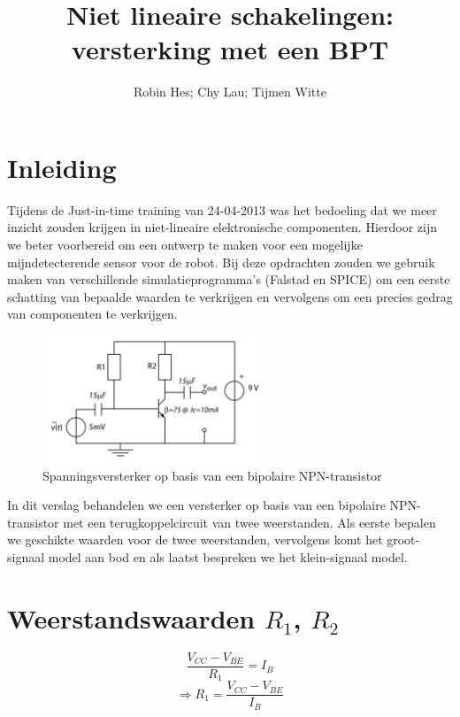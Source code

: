 \documentclass{article}
\title{Niet lineaire schakelingen: versterking met een BPT}
\author{Robin Hes; Chy Lau; Tijmen Witte}
\begin{document}
\maketitle

\section*{Inleiding}

Tijdens de Just-in-time training van 24-04-2013 was het bedoeling dat we meer inzicht zouden krijgen in niet-lineaire elektronische componenten. Hierdoor 
zijn we beter voorbereid om een ontwerp te maken voor een mogelijke mijndetecterende sensor voor de robot. Bij deze opdrachten zouden we gebruik maken van verschillende simulatieprogramma's (Falstad en SPICE) om een eerste schatting van bepaalde waarden te verkrijgen en vervolgens om een precies gedrag van componenten te verkrijgen.

\begin{figure}[H]
	\centering
	\label{fig:npn-amplifier}
	\includegraphics[width=0.6\textwidth]{resource/npn-amplifier}
	\caption{Spanningsversterker op basis van een bipolaire NPN-transistor \cite[p.~3]{epo2-non-linear}}
\end{figure}

\noindent
In dit verslag behandelen we een versterker op basis van een bipolaire NPN-transistor met een terugkoppelcircuit van twee weerstanden. Als eerste bepalen we geschikte waarden voor de twee weerstanden, vervolgens komt het groot-signaal model aan bod en als laatst bespreken we het klein-signaal model.

\section*{Weerstandswaarden $R_1$, $R_2$}

\begin{equation}
\frac{V_{CC}-V_{BE}}{R_1}=I_B 
\end{equation}
$$\Rightarrow R_1=\frac{V_{CC}-V_{BE}}{I_B}$$
\end{document}

